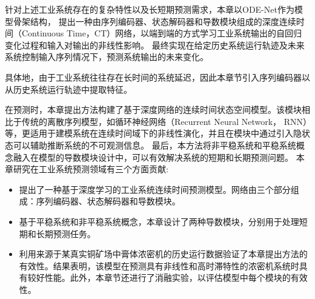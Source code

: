 针对上述工业系统存在的复杂特性以及长短期预测需求，本章以ODE-Net作为模型骨架结构，
提出一种由序列编码器、状态解码器和导数模块组成的深度连续时间（Continuous Time，CT）网络，以端到端的方式学习工业系统输出的自回归变化过程和输入对输出的非线性影响。
最终实现在给定历史系统运行轨迹及未来系统控制输入序列情况下，预测系统输出的未来变化。

具体地，由于工业系统往往存在长时间的系统延迟，因此本章节引入序列编码器以从历史系统运行轨迹中提取特征。

在预测时，本章提出方法构建了基于深度网络的连续时间状态空间模型。该模块相比于传统的离散序列模型，如循环神经网络（Recurrent Neural Network， RNN）等，更适用于建模系统在连续时间域下的非线性演化，并且在模块中通过引入隐状态可以辅助推断系统的不可观测信息。
最后，本方法将非平稳系统和平稳系统概念融入在模型的导数模块设计中，可以有效解决系统的短期和长期预测问题。
本章研究在工业系统预测领域有三个方面贡献:
\begin{itemize}
    \setlength{\itemsep}{0pt}
    \setlength{\parsep}{0pt}
    \setlength{\parskip}{0pt}
    \setlength{\topsep}{0pt}
    \setlength{\partopsep}{0pt}
\item 提出了一种基于深度学习的工业系统连续时间预测模型。网络由三个部分组成：序列编码器、状态解码器和导数模块。
\item 基于平稳系统和非平稳系统概念，本章设计了两种导数模块，分别用于处理短期和长期预测任务。
\item 利用来源于某真实铜矿场中膏体浓密机的历史运行数据验证了本章提出方法的有效性。结果表明，该模型在预测具有非线性和高时滞特性的浓密机系统时具有较好性能。此外，本章节还进行了消融实验，以评估模型中每个模块的有效性。
\end{itemize}

